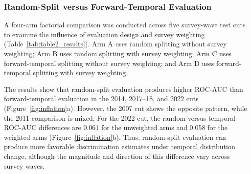 \documentclass[a4paper,fleqn]{cas-sc}
\begin{document}
\subsubsection{Random-Split versus Forward-Temporal Evaluation}

A four-arm factorial comparison was conducted across five survey-wave test cuts to examine the influence of evaluation design and survey weighting (Table~\ref{tab:table2_results}). Arm A uses random splitting without survey weighting; Arm B uses random splitting with survey weighting; Arm C uses forward-temporal splitting without survey weighting; and Arm D uses forward-temporal splitting with survey weighting.

\begin{table}[pos=htbp]
\centering
\caption{ROC-AUC comparison across random-split and forward-temporal evaluation arms.}
\label{tab:table2_results}
\scriptsize
{}
\end{table}

The results show that random-split evaluation produces higher ROC-AUC than forward-temporal evaluation in the 2014, 2017--18, and 2022 cuts (Figure~\ref{fig:inflation}a). However, the 2007 cut shows the opposite pattern, while the 2011 comparison is mixed. For the 2022 cut, the random-versus-temporal ROC-AUC differences are 0.061 for the unweighted arms and 0.058 for the weighted arms (Figure~\ref{fig:inflation}b). Thus, random-split evaluation can produce more favorable discrimination estimates under temporal distribution change, although the magnitude and direction of this difference vary across survey waves.
\end{document}
